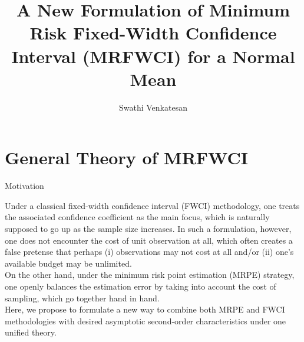 \documentclass [xcolor=svgnames, t] {beamer}
\title[]{A New Formulation of Minimum Risk Fixed-Width Confidence
Interval (MRFWCI) for a Normal Mean}
\institute[]{Department of Statistics \\ University of Connecticut}
\author[]{ Swathi Venkatesan }
\date{}
\begin{document}
\begin{frame}
\maketitle
\end{frame}




\section{General Theory of MRFWCI}

\begin{frame}{Motivation}

Under a classical fixed-width confidence interval (FWCI) methodology, one treats the associated confidence coefficient as the main focus, which is naturally supposed to go up as the sample size increases. In such a formulation, however, one does not encounter the cost of unit observation at all,
which often creates a false pretense that perhaps (i) observations may not cost at all
and/or (ii) one’s available budget may be unlimited.\\
\vspace{0.2cm}
On the other hand, under the minimum risk point estimation (MRPE) strategy, one openly balances the estimation
error by taking into account the cost of sampling, which go together hand in hand.\\
\vspace{0.2cm}
Here, we propose to formulate a new way to combine both MRPE and FWCI methodologies
with desired asymptotic second-order characteristics under one unified theory.

\end{frame}
\end{document}
